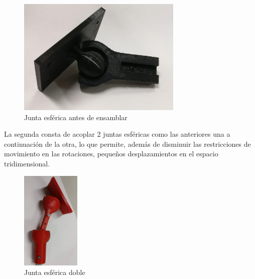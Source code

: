 \begin{itemize}
	\begin{figure}[htb!]
		\centering
		
		
		\includegraphics[width=0.7\textwidth]{hardware/spheric_union}
		\caption{ Junta esférica antes de ensamblar}
		\label{d}
	\end{figure}
	
	
	La segunda consta de acoplar 2 juntas esféricas como las anteriores una a continuación de la otra, lo que permite, además de disminuir las restricciones de movimiento en las rotaciones, pequeños desplazamientos en el espacio tridimensional.
	
\begin{figure}[htb!]
	\centering
	\includegraphics[width=0.25\textwidth]{hardware/spheric_union_double}
	\caption{ Junta esférica doble}
	\label{d}
\end{figure}

	
\end{itemize}

